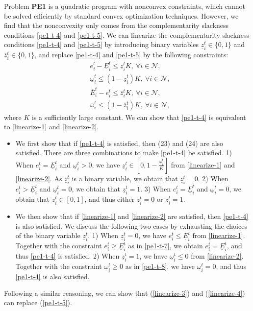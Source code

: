 \documentclass[journal]{IEEEtran}
\begin{document}
	Problem \textbf{PE1} is a quadratic program with nonconvex constraints, which cannot be solved efficiently by standard convex optimization techniques. However, we find that the nonconvexity only comes from the complementarity slackness conditions \eqref{pe1-t-4} and \eqref{pe1-t-5}. We can linearize the complementarity slackness conditions \eqref{pe1-t-4} and \eqref{pe1-t-5} by introducing binary variables $\underline{z}_{i}^{t} \in \{ 0,1 \}$ and $\overline{z}_{i}^{t} \in \{ 0,1 \}$, and replace \eqref{pe1-t-4} and \eqref{pe1-t-5} by the following constraints:
	\begin{align}
		& e_{i}^{t} - \underline{E}_{i}^{t} \leq \underline{z}_{i}^{t} K ,~\forall i\in\mathcal {N}, \label{linearize-1} \\
		& \underline{\omega}_{i}^{t} \leq (1-\underline{z}_{i}^{t}) K ,~\forall i\in\mathcal {N}, \label{linearize-2} \\
		& \overline{E}_{i}^{t} - e_{i}^{t} \leq \overline{z}_{i}^{t} K ,~\forall i\in\mathcal {N}, \label{linearize-3} \\
		& \overline{\omega}_{i}^{t}  \leq (1-\overline{z}_{i}^{t}) K ,~\forall i\in\mathcal {N}, \label{linearize-4}
	\end{align}
	where $K$ is a sufficiently large constant. We can show that \eqref{pe1-t-4} is equivalent to \eqref{linearize-1} and \eqref{linearize-2}. 
	\begin{itemize}
		\item We first show that if \eqref{pe1-t-4} is satisfied, then (23) and (24) are also satisfied. There are three combinations to make \eqref{pe1-t-4} be satisfied. 1) When $e_{i}^{t} = \underline{E}_{i}^{t}$ and $\underline{\omega}_{i}^{t} > 0$, we have $\underline{z}_{i}^{t} \in [0, 1-\frac{\underline{\omega}_{i}^{t}}{K}]$ from \eqref{linearize-1} and \eqref{linearize-2}. As $\underline{z}_{i}^{t}$ is a binary variable, we obtain that $\underline{z}_{i}^{t} =0$. 2) When $e_{i}^{t} > \underline{E}_{i}^{t}$ and $\underline{\omega}_{i}^{t} = 0$, we obtain that $\underline{z}_{i}^{t} = 1$. 3) When $e_{i}^{t} = \underline{E}_{i}^{t}$ and $\underline{\omega}_{i}^{t} = 0$, we obtain that $\underline{z}_{i}^{t} \in [0,1]$, and thus either $\underline{z}_{i}^{t} = 0$ or $\underline{z}_{i}^{t} = 1$.
		\item We then show that if \eqref{linearize-1} and \eqref{linearize-2} are satisfied, then \eqref{pe1-t-4} is also satisfied. We discuss the following two cases by exhausting the choices of the binary variable $\underline{z}_{i}^{t}$. 1) When $\underline{z}_{i}^{t} = 0$, we have $e_{i}^{t} \leq \underline{E}_{i}^{t}$ from \eqref{linearize-1}. Together with the constraint $e_{i}^{t} \geq \underline{E}_{i}^{t}$ as in \eqref{pe1-t-7}, we obtain $e_{i}^{t} = \underline{E}_{i}^{t}$, and thus \eqref{pe1-t-4} is satisfied. 2) When $\underline{z}_{i}^{t} = 1$, we have $\underline{\omega}_{i}^{t} \leq 0$ from \eqref{linearize-2}. Together with the constraint $\underline{\omega}_{i}^{t} \geq 0$ as in \eqref{pe1-t-8}, we have $\underline{\omega}_{i}^{t} = 0$, and thus \eqref{pe1-t-4} is also satisfied. 
	\end{itemize}
		Following a similar reasoning, we can show that (\ref{linearize-3}) and (\ref{linearize-4}) can replace (\ref{pe1-t-5}).
	
\end{document}
